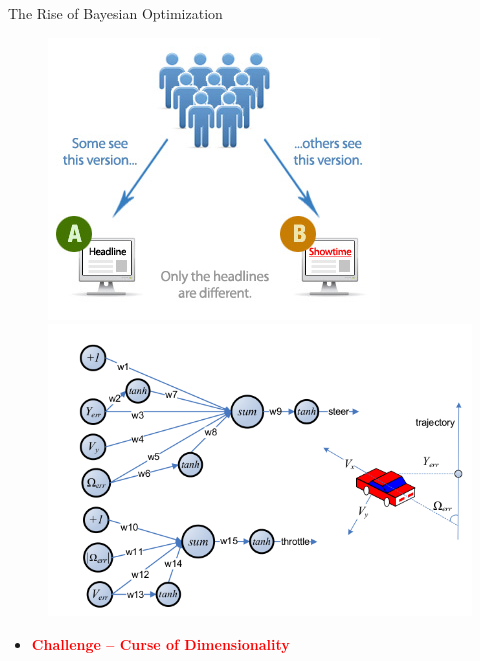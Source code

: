 \documentclass[grey]{beamer}
\begin{document}
\begin{frame}{The Rise of Bayesian Optimization}
\begin{minipage}[r]{0.48\columnwidth}
\begin{figure}[t]
      \includegraphics[width=0.6\columnwidth]{./figs/abtest}
      \includegraphics[width=0.6\columnwidth]{./figs/control}
     \end{figure}
    \end{minipage}
 \begin{itemize}
    \item {\bf \textcolor{red}{ Challenge -- Curse of Dimensionality}}
   \end{itemize}
 \end{frame}

%   
\end{document}
